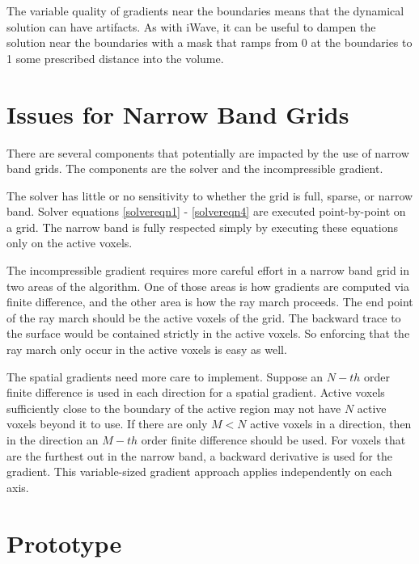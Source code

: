 \documentclass{article}
\begin{document}

The variable quality of gradients near the boundaries means that the dynamical solution can have artifacts.  As with iWave, it can be useful to dampen the solution near the boundaries with a mask that ramps from 0 at the boundaries to 1 some prescribed distance into the volume.  

 


\section{Issues for Narrow Band Grids}\label{nbsection}


There are several components that potentially are impacted by the use of narrow band grids.  The components are the solver and the incompressible gradient.

The solver has little or no sensitivity to whether the grid is full, sparse, or narrow band.  Solver equations \ref{solvereqn1} - \ref{solvereqn4} are executed point-by-point on a grid. The narrow band is fully respected simply by executing these equations only on the active voxels. 

The incompressible gradient requires more careful effort in a narrow band grid in two areas of the algorithm.  One of those areas is how gradients are computed via finite difference, and the other area is how the ray march proceeds.  The end point of the ray march should be the active voxels of the grid. The backward trace to the surface would be contained strictly in the active voxels.  So enforcing that the ray march only occur in the active voxels is easy as well.

The spatial gradients need more care to implement.   Suppose an $N-th$ order finite difference is used in each direction for a spatial gradient.  Active voxels sufficiently close to the boundary of the active region may not have $N$ active voxels beyond it to use.  If there are only $M < N$ active voxels in a direction, then in the direction an $M-th$ order finite difference should be used.  For voxels that are the furthest out in the narrow band, a backward derivative is used for the gradient.  This variable-sized gradient approach applies independently on each axis.   

 



\section{Prototype}\label{prototype}
\end{document}
